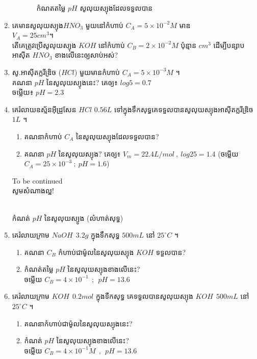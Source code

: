 \documentclass[12pt, a4paper]{article}
\begin{document}
\begin{enumerate}[m, 2]
\begin{enumerate}[k]
\begin{enumerate}[m]
				កំណតតម្លៃ $pH$ សូលុយស្យុងដែលទទួលបាន
			\end{enumerate}
		\end{enumerate}
		\item គេមានសូលុយស្យុង$HNO_3$ មួយនៅកំហាប់ $C_A=5\times10^{-2}M$ មាឌ \\$V_A=25cm^3$។\\
		តើគេត្រូវប្រើសូលុយស្យុង $KOH$ នៅកំហាប់ $C_B=2\times10^{-2}M$ ប៉ុន្មាន $cm^3$ ដើម្បីបន្សាបអាស៊ីត $HNO_3$ ខាងលើនេះឲ្យសាប់អស់? 
		\item សូ.អាស៊ីតក្លរីឌ្រិច ($HCl$) មួយមានកំហាប់ $C_A=5\times10^{-3}M$ ។\\
		គណនា $pH$ នៃសូលុយស្យុងនេះ? គេឲ្យ៖ $log5=0.7$\\
		ចម្លើយ៖ $pH=2.3$ 
		\item គេរំលាយឧស្ម័នអ៊ីដ្រូសែន $HCl$ $0.56L$ ទៅក្នុងទឹកសុទ្ធគេទទួលបានសូលុយស្យុងអាស៊ីតក្លរីឌ្រិច $1L$ ។
		\begin{enumerate}[k]
			\item គណនាកំហាប់ $C_A$ នៃសូលុយស្យុងដែលទទួលបាន? 
			\item គណនា $pH$ នៃសូលុយស្យុង? គេឲ្យ៖ $V_m=22.4L/mol~,~log25=1.4$ (ចម្លើយ $C_A=25\times10^{-3}~;~pH=1.6$)
		\end{enumerate}
		\begin{center}
			To be continued\\
			\sffamily\color{black}
			សូមសំណាងល្អ!
		\end{center}\newpage
		\vspace{-1em}
		\begin{center}
		\sffamily\color{black}
		\\
		កំណត់ $pH$ នៃសូលុយស្យូង (លំហាត់សុទ្ធ)
		\end{center}
		\item គេរំលាយក្រាម $NaOH~~3.2g$ ក្នុងទឹកសុទ្ធ $500mL$ នៅ $25^\circ C$ ។
		\begin{enumerate}[k]
			\item គណនា $C_B$ កំហាប់ជាម៉ូលនៃសូលុយស្យុង $KOH$ ទទួលបាន?
			\item កំណត់តម្លៃ $pH$ នៃសូលុយស្យុងខាងលើនេះ? \\ចម្លើយ $C_B=4\times10^{-1}~~;~~pH=13.6$
		\end{enumerate}
		\item គេរំលាយក្រាម $KOH~~0.2mol$ ក្នុងទឺកសុទ្ធ គេទទួលបានសូលុយស្យុង $KOH~~500mL$ នៅ $25^\circ C$ ។
		\begin{enumerate}[k]
			\item គណនាកំហាប់ជាម៉ូលនៃសូលុយស្យុងនេះ?
			\item កំណត់ $pH$ នៃសូលុយស្យុងខាងលើនេះ? \\ចម្លើយ $C_B=4\times10^{-1} M~~,~~pH=13.6$ 

\end{enumerate}
\end{enumerate}
\end{document}
